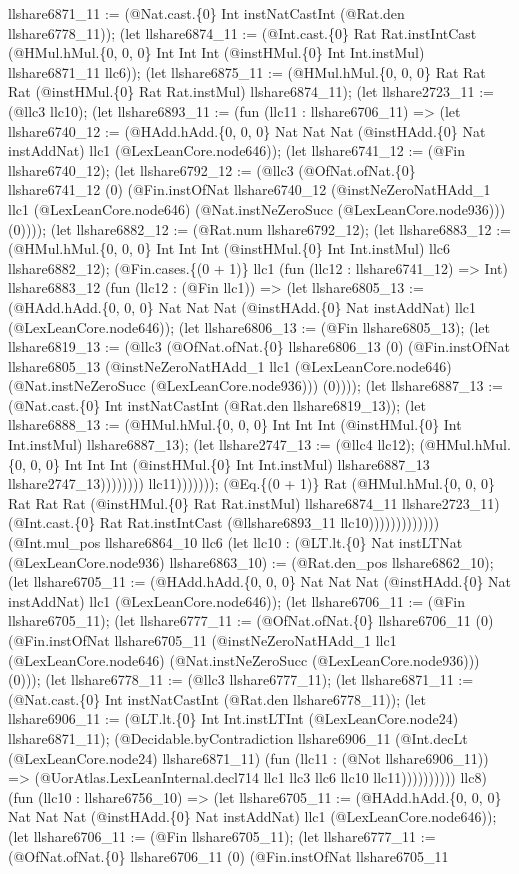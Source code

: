 \documentclass[11pt]{article}
\begin{document}
llshare6871\_11 := (@Nat.cast.\{0\} Int instNatCastInt (@Rat.den llshare6778\_11)); (let llshare6874\_11 := (@Int.cast.\{0\} Rat Rat.instIntCast (@HMul.hMul.\{0, 0, 0\} Int Int Int (@instHMul.\{0\} Int Int.instMul) llshare6871\_11 llc6)); (let llshare6875\_11 := (@HMul.hMul.\{0, 0, 0\} Rat Rat Rat (@instHMul.\{0\} Rat Rat.instMul) llshare6874\_11); (let llshare2723\_11 := (@llc3 llc10); (let llshare6893\_11 := (fun (llc11 : llshare6706\_11) => (let llshare6740\_12 := (@HAdd.hAdd.\{0, 0, 0\} Nat Nat Nat (@instHAdd.\{0\} Nat instAddNat) llc1 (@LexLeanCore.node646)); (let llshare6741\_12 := (@Fin llshare6740\_12); (let llshare6792\_12 := (@llc3 (@OfNat.ofNat.\{0\} llshare6741\_12 (0) (@Fin.instOfNat llshare6740\_12 (@instNeZeroNatHAdd\_1 llc1 (@LexLeanCore.node646) (@Nat.instNeZeroSucc (@LexLeanCore.node936))) (0)))); (let llshare6882\_12 := (@Rat.num llshare6792\_12); (let llshare6883\_12 := (@HMul.hMul.\{0, 0, 0\} Int Int Int (@instHMul.\{0\} Int Int.instMul) llc6 llshare6882\_12); (@Fin.cases.\{(0 + 1)\} llc1 (fun (llc12 : llshare6741\_12) => Int) llshare6883\_12 (fun (llc12 : (@Fin llc1)) => (let llshare6805\_13 := (@HAdd.hAdd.\{0, 0, 0\} Nat Nat Nat (@instHAdd.\{0\} Nat instAddNat) llc1 (@LexLeanCore.node646)); (let llshare6806\_13 := (@Fin llshare6805\_13); (let llshare6819\_13 := (@llc3 (@OfNat.ofNat.\{0\} llshare6806\_13 (0) (@Fin.instOfNat llshare6805\_13 (@instNeZeroNatHAdd\_1 llc1 (@LexLeanCore.node646) (@Nat.instNeZeroSucc (@LexLeanCore.node936))) (0)))); (let llshare6887\_13 := (@Nat.cast.\{0\} Int instNatCastInt (@Rat.den llshare6819\_13)); (let llshare6888\_13 := (@HMul.hMul.\{0, 0, 0\} Int Int Int (@instHMul.\{0\} Int Int.instMul) llshare6887\_13); (let llshare2747\_13 := (@llc4 llc12); (@HMul.hMul.\{0, 0, 0\} Int Int Int (@instHMul.\{0\} Int Int.instMul) llshare6887\_13 llshare2747\_13)))))))) llc11))))))); (@Eq.\{(0 + 1)\} Rat (@HMul.hMul.\{0, 0, 0\} Rat Rat Rat (@instHMul.\{0\} Rat Rat.instMul) llshare6874\_11 llshare2723\_11) (@Int.cast.\{0\} Rat Rat.instIntCast (@llshare6893\_11 llc10))))))))))))) (@Int.mul\_pos llshare6864\_10 llc6 (let llc10 : (@LT.lt.\{0\} Nat instLTNat (@LexLeanCore.node936) llshare6863\_10) := (@Rat.den\_pos llshare6862\_10); (let llshare6705\_11 := (@HAdd.hAdd.\{0, 0, 0\} Nat Nat Nat (@instHAdd.\{0\} Nat instAddNat) llc1 (@LexLeanCore.node646)); (let llshare6706\_11 := (@Fin llshare6705\_11); (let llshare6777\_11 := (@OfNat.ofNat.\{0\} llshare6706\_11 (0) (@Fin.instOfNat llshare6705\_11 (@instNeZeroNatHAdd\_1 llc1 (@LexLeanCore.node646) (@Nat.instNeZeroSucc (@LexLeanCore.node936))) (0))); (let llshare6778\_11 := (@llc3 llshare6777\_11); (let llshare6871\_11 := (@Nat.cast.\{0\} Int instNatCastInt (@Rat.den llshare6778\_11)); (let llshare6906\_11 := (@LT.lt.\{0\} Int Int.instLTInt (@LexLeanCore.node24) llshare6871\_11); (@Decidable.byContradiction llshare6906\_11 (@Int.decLt (@LexLeanCore.node24) llshare6871\_11) (fun (llc11 : (@Not llshare6906\_11)) => (@UorAtlas.LexLeanInternal.decl714 llc1 llc3 llc6 llc10 llc11)))))))))) llc8) (fun (llc10 : llshare6756\_10) => (let llshare6705\_11 := (@HAdd.hAdd.\{0, 0, 0\} Nat Nat Nat (@instHAdd.\{0\} Nat instAddNat) llc1 (@LexLeanCore.node646)); (let llshare6706\_11 := (@Fin llshare6705\_11); (let llshare6777\_11 := (@OfNat.ofNat.\{0\} llshare6706\_11 (0) (@Fin.instOfNat llshare6705\_11 
\end{document}
